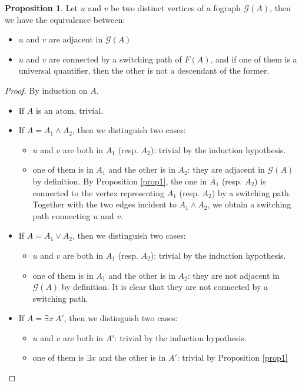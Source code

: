 \documentclass[conference,twosided,10pt]{IEEEtran}
\theoremstyle{definition}
\newtheorem{proposition}[thm]{Proposition}
\newcommand{\Gr}{\mathcal{G}}
\begin{document}
\begin{proposition}
\label{prop2}
Let $u$ and $v$ be two distinct vertices of a fograph $\Gr(A)$, then we have the equivalence
between:
\begin{itemize}
  \item $u$ and $v$ are adjacent in $\Gr(A)$
  \item $u$ and $v$ are connected by a switching path of $F(A)$, and if one of them is a universal quantifier, then the other is
	not a descendant of the former.
  \end{itemize}
\begin{proof}
By induction on $A$.
\begin{itemize}
  \item If $A$ is an atom, trivial.
  \item If $A = A_1 \wedge A_2$, then we distinguish two cases:
    \begin{itemize}
      \item $u$ and $v$ are both in $A_1$ (resp. $A_2$): trivial by
	      the induction hypothesis.
      \item one of them is in $A_1$ and the other is in $A_2$: they are
	      adjacent in $\Gr(A)$ by definition. By Proposition \ref{prop1},
		    the one in $A_1$ (resp. $A_2$) is connected to the
		    vertex representing $A_1$ (resp. $A_2$) by a switching
		    path. Together with the two edges incident to $A_1 \wedge
		    A_2$, we obtain a switching path connecting $u$ and $v$.
    \end{itemize}
  \item If $A = A_1 \vee A_2$, then we distinguish two cases:
    \begin{itemize}
      \item $u$ and $v$ are both in $A_1$ (resp. $A_2$): trivial by
	      the induction hypothesis.
      \item one of them is in $A_1$ and the other is in $A_2$: they are not
	      adjacent in $\Gr(A)$ by definition. It is clear that they
		    are not connected by a switching path.
    \end{itemize}
  \item If $A = \exists x \ A'$, then we distinguish two cases:
    \begin{itemize}
      \item $u$ and $v$ are both in $A'$: trivial by the induction
	      hypothesis.
      \item one of them is $\exists x$ and the other is in $A'$: trivial
	      by Proposition \ref{prop1}


\end{itemize}
\end{itemize}
\end{proof}
\end{proposition}
\end{document}
